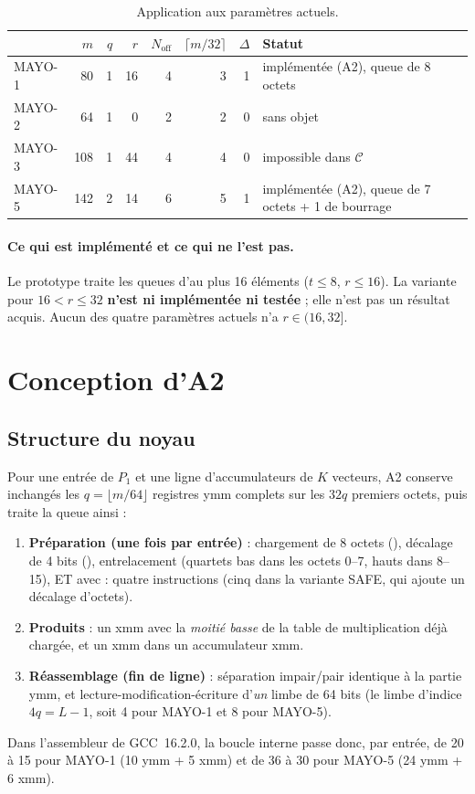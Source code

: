 \begin{table}[ht]\centering\small
\caption{Application aux paramètres actuels.}\label{tab:delta}
\begin{tabular}{@{}lrrrrrrl@{}}\toprule
 & $m$ & $q$ & $r$ & $N_{\mathrm{off}}$ & $\lceil m/32\rceil$ & $\Delta$ & Statut\\\midrule
MAYO-1 & 80 & 1 & 16 & 4 & 3 & 1 & implémentée (A2), queue de 8 octets\\
MAYO-2 & 64 & 1 & 0 & 2 & 2 & 0 & sans objet\\
MAYO-3 & 108 & 1 & 44 & 4 & 4 & 0 & impossible dans $\mathcal{C}$\\
MAYO-5 & 142 & 2 & 14 & 6 & 5 & 1 & implémentée (A2), queue de 7 octets + 1 de bourrage\\\bottomrule
\end{tabular}
\end{table}

\paragraph{Ce qui est implémenté et ce qui ne l'est pas.} Le prototype traite les queues d'au plus 16 éléments ($t\le8$, $r\le16$). La variante pour $16<r\le32$ \textbf{n'est ni implémentée ni testée} ; elle n'est pas un résultat acquis. Aucun des quatre paramètres actuels n'a $r\in(16,32]$.

\section{Conception d'A2}
\subsection{Structure du noyau}
Pour une entrée de $P_1$ et une ligne d'accumulateurs de $K$ vecteurs, A2 conserve inchangés les $q=\lfloor m/64\rfloor$ registres ymm complets sur les $32q$ premiers octets, puis traite la queue ainsi :
\begin{enumerate}[nosep]
\item \textbf{Préparation (une fois par entrée)} : chargement de 8 octets (), décalage de 4 bits (), entrelacement  (quartets bas dans les octets 0--7, hauts dans 8--15), ET avec  : quatre instructions (cinq dans la variante SAFE, qui ajoute un décalage d'octets).
\item \textbf{Produits} : un  xmm avec la \emph{moitié basse} de la table de multiplication déjà chargée, et un  xmm dans un accumulateur xmm.
\item \textbf{Réassemblage (fin de ligne)} : séparation impair/pair identique à la partie ymm, et lecture-modification-écriture d'\emph{un} limbe de 64 bits (le limbe d'indice $4q=L-1$, soit 4 pour MAYO-1 et 8 pour MAYO-5).
\end{enumerate}
Dans l'assembleur de GCC~16.2.0, la boucle interne passe donc, par entrée, de 20 à 15  pour MAYO-1 (10 ymm + 5 xmm) et de 36 à 30 pour MAYO-5 (24 ymm + 6 xmm).


